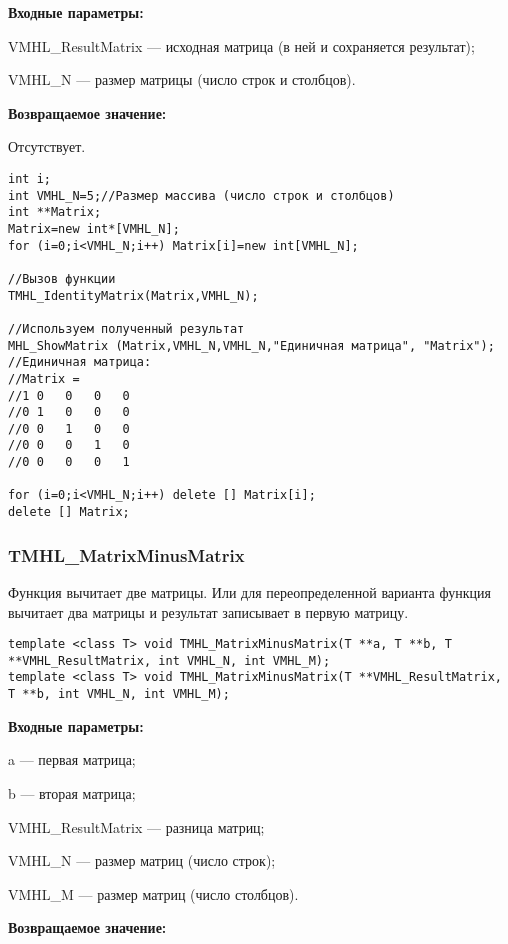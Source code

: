 \documentclass[a4paper,12pt]{article}
\begin{document}
\textbf{Входные параметры:}  
 
VMHL\_ResultMatrix --- исходная матрица (в ней и сохраняется результат);
 
VMHL\_N --- размер матрицы (число строк и столбцов).

\textbf{Возвращаемое значение:}

Отсутствует.


\begin{lstlisting}[label=code_use_TMHL_IdentityMatrix,caption=Пример использования]
int i;
int VMHL_N=5;//Размер массива (число строк и столбцов)
int **Matrix;
Matrix=new int*[VMHL_N];
for (i=0;i<VMHL_N;i++) Matrix[i]=new int[VMHL_N];

//Вызов функции
TMHL_IdentityMatrix(Matrix,VMHL_N);

//Используем полученный результат
MHL_ShowMatrix (Matrix,VMHL_N,VMHL_N,"Единичная матрица", "Matrix");
//Единичная матрица:
//Matrix =
//1	0	0	0	0
//0	1	0	0	0
//0	0	1	0	0
//0	0	0	1	0
//0	0	0	0	1

for (i=0;i<VMHL_N;i++) delete [] Matrix[i];
delete [] Matrix;
\end{lstlisting}

\subsubsection{TMHL\_MatrixMinusMatrix}\label{TMHL_MatrixMinusMatrix}

Функция вычитает две матрицы. Или для переопределенной варианта функция вычитает два матрицы и результат записывает в первую матрицу. 


\begin{lstlisting}[label=code_syntax_TMHL_MatrixMinusMatrix,caption=Синтаксис]
template <class T> void TMHL_MatrixMinusMatrix(T **a, T **b, T **VMHL_ResultMatrix, int VMHL_N, int VMHL_M);
template <class T> void TMHL_MatrixMinusMatrix(T **VMHL_ResultMatrix, T **b, int VMHL_N, int VMHL_M);
\end{lstlisting}

\textbf{Входные параметры:}

 a --- первая матрица;
 
 b --- вторая матрица;
 
 VMHL\_ResultMatrix --- разница матриц;
 
 VMHL\_N --- размер матриц (число строк);
 
 VMHL\_M --- размер матриц (число столбцов).

\textbf{Возвращаемое значение:}
\end{document}
